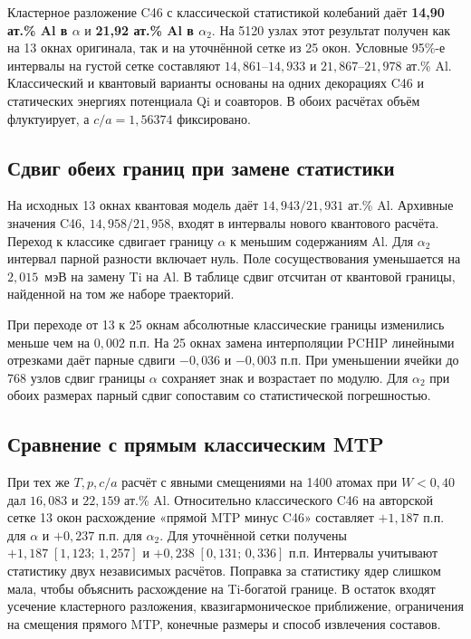 \noindent Кластерное разложение C46 с классической статистикой колебаний даёт
\textbf{14,90 ат.\% Al в \(\alpha\)} и
\textbf{21,92 ат.\% Al в \(\alpha_2\)}.
На 5120 узлах этот результат получен как на 13 окнах оригинала, так и на
уточнённой сетке из 25 окон. Условные 95\%-е интервалы на густой сетке
составляют \(14{,}861\)--\(14{,}933\) и \(21{,}867\)--\(21{,}978\)
ат.\% Al. Классический и квантовый варианты основаны на
одних декорациях C46 и статических энергиях потенциала Qi и соавторов.
В обоих расчётах объём флуктуирует, а \(c/a=1{,}56374\) фиксировано.

\subsection*{Сдвиг обеих границ при замене статистики}
На исходных 13 окнах квантовая модель даёт \(14{,}943/21{,}931\) ат.\%
Al. Архивные значения C46, \(14{,}958/21{,}958\), входят в интервалы
нового квантового расчёта. Переход к классике сдвигает границу
\(\alpha\) к меньшим содержаниям Al. Для \(\alpha_2\) интервал парной разности
включает нуль. Поле сосуществования уменьшается на \(2{,}015\)~мэВ на
замену Ti на Al. В таблице сдвиг отсчитан от квантовой границы, найденной
на том же наборе траекторий.


При переходе от 13 к 25 окнам абсолютные классические границы изменились
меньше чем на \(0{,}002\) п.п. На 25 окнах замена интерполяции PCHIP
линейными отрезками даёт парные сдвиги \(-0{,}036\) и \(-0{,}003\) п.п.
При уменьшении ячейки до 768 узлов сдвиг границы \(\alpha\) сохраняет
знак и возрастает по модулю. Для \(\alpha_2\) при обоих размерах
парный сдвиг сопоставим со статистической погрешностью.

\subsection*{Сравнение с прямым классическим MTP}
При тех же \(T,p,c/a\) расчёт с явными смещениями на 1400 атомах при
\(W<0{,}40\) дал \(16{,}083\) и \(22{,}159\) ат.\% Al. Относительно
классического C46 на авторской сетке 13 окон расхождение
«прямой MTP минус C46» составляет \(+1{,}187\) п.п. для \(\alpha\)
и \(+0{,}237\) п.п. для \(\alpha_2\). Для уточнённой сетки получены
\(+1{,}187\;[1{,}123;\,1{,}257]\) и \(+0{,}238\;[0{,}131;\,0{,}336]\)
п.п. Интервалы учитывают статистику двух независимых расчётов.
Поправка за статистику ядер слишком мала, чтобы объяснить расхождение
на Ti-богатой границе. В остаток входят усечение кластерного разложения,
квазигармоническое приближение, ограничения на смещения прямого MTP,
конечные размеры и способ извлечения составов.
